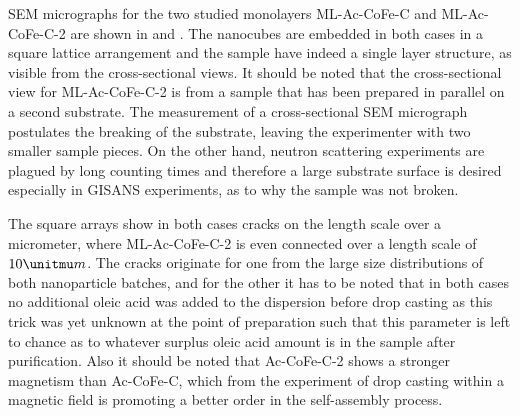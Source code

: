 \documentclass[\main/dresen_thesis.tex]{subfiles}
\begin{document}
  SEM micrographs for the two studied monolayers ML-Ac-CoFe-C and ML-Ac-CoFe-C-2 are shown in  and .
  The nanocubes are embedded in both cases in a square lattice arrangement and the sample have indeed a single layer structure, as visible from the cross-sectional views.
  It should be noted that the cross-sectional view for ML-Ac-CoFe-C-2 is from a sample that has been prepared in parallel on a second substrate.
  The measurement of a cross-sectional SEM micrograph postulates the breaking of the substrate, leaving the experimenter with two smaller sample pieces.
  On the other hand, neutron scattering experiments are plagued by long counting times and therefore a large substrate surface is desired especially in GISANS experiments, as to why the sample was not broken.

  The square arrays show in both cases cracks on the length scale over a micrometer, where ML-Ac-CoFe-C-2 is even connected over a length scale of $10 \unitmu m$.
  The cracks originate for one from the large size distributions of both nanoparticle batches, and for the other it has to be noted that in both cases no additional oleic acid was added to the dispersion before drop casting as this trick was yet unknown at the point of preparation such that this parameter is left to chance as to whatever surplus oleic acid amount is in the sample after purification.
  Also it should be noted that Ac-CoFe-C-2 shows a stronger magnetism than Ac-CoFe-C, which from the experiment of drop casting within a magnetic field is promoting a better order in the self-assembly process.
\end{document}
